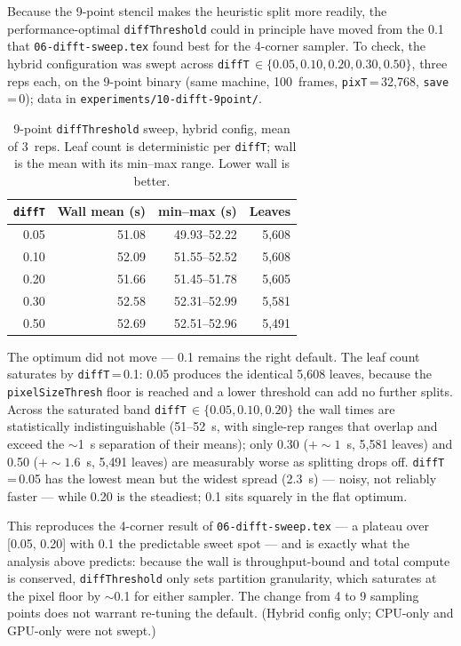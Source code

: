 \documentclass[
	english,
	letterpaper, oneside
]{article}
\begin{document}
Because the 9-point stencil makes the heuristic split more readily, the
performance-optimal \texttt{diffThreshold} could in principle have moved from the
0.1 that \texttt{06-difft-sweep.tex} found best for the 4-corner sampler. To
check, the hybrid configuration was swept across
\texttt{diffT}\,$\in\{0.05,0.10,0.20,0.30,0.50\}$, three reps each, on the
9-point binary (same machine, 100~frames, \texttt{pixT}\,=\,32{,}768,
\texttt{save}\,=\,0); data in \texttt{experiments/10-difft-9point/}.

\begin{table}[H]
    \centering
    \caption{9-point \texttt{diffThreshold} sweep, hybrid config, mean of 3~reps.
             Leaf count is deterministic per \texttt{diffT}; wall is the mean with
             its min--max range. Lower wall is better.}
    \label{tab:difft}
    \begin{tabular}{rrrr}
        \hline
        \texttt{diffT} & Wall mean (s) & min--max (s) & Leaves \\
        \hline
        0.05 & 51.08 & 49.93--52.22 & 5{,}608 \\
        0.10 & 52.09 & 51.55--52.52 & 5{,}608 \\
        0.20 & 51.66 & 51.45--51.78 & 5{,}605 \\
        0.30 & 52.58 & 52.31--52.99 & 5{,}581 \\
        0.50 & 52.69 & 52.51--52.96 & 5{,}491 \\
        \hline
    \end{tabular}
\end{table}

The optimum did not move --- 0.1 remains the right default. The leaf
count saturates by \texttt{diffT}\,=\,0.1: 0.05 produces the identical
5{,}608 leaves, because the \texttt{pixelSizeThresh} floor is reached and a lower
threshold can add no further splits. Across the saturated band
\texttt{diffT}\,$\in\{0.05,0.10,0.20\}$ the wall times are statistically
indistinguishable (51--52~s, with single-rep ranges that overlap and exceed the
$\sim$1~s separation of their means); only 0.30 ($+{\sim}1$~s, 5{,}581 leaves)
and 0.50 ($+{\sim}1.6$~s, 5{,}491 leaves) are measurably worse as splitting
drops off. \texttt{diffT}\,=\,0.05 has the lowest mean but the widest spread
(2.3~s) --- noisy, not reliably faster --- while 0.20 is the steadiest; 0.1 sits
squarely in the flat optimum.

This reproduces the 4-corner result of \texttt{06-difft-sweep.tex} --- a plateau
over [0.05, 0.20] with 0.1 the predictable sweet spot --- and is exactly what
the analysis above predicts: because the wall is throughput-bound and total
compute is conserved, \texttt{diffThreshold} only sets partition granularity,
which saturates at the pixel floor by $\sim$0.1 for either sampler. The
change from 4 to 9 sampling points does not warrant re-tuning the default.
(Hybrid config only; CPU-only and GPU-only were not swept.)
\end{document}

